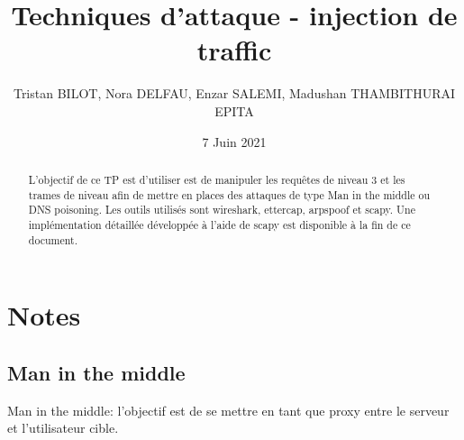 \documentclass[12pt, oneside]{article}
\begin{document}
\title{Techniques d'attaque - injection de traffic}
\author{Tristan BILOT, Nora DELFAU, Enzar SALEMI, Madushan THAMBITHURAI\\EPITA}
\date{7 Juin 2021}
\maketitle

\begin{abstract}
L'objectif de ce TP est d'utiliser est de manipuler les requêtes de niveau 3 et les trames de niveau afin de mettre en places des attaques de type Man in the middle ou DNS poisoning. Les outils utilisés sont wireshark, ettercap, arpspoof et scapy. Une implémentation détaillée développée à l'aide de scapy est disponible à la fin de ce document.
\end{abstract}

\section{Notes}
\subsection{Man in the middle}
Man in the middle: l'objectif est de se mettre en tant que proxy entre le serveur et l'utilisateur cible.
\end{document}
